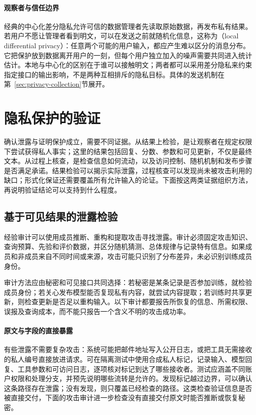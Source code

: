 \paragraph{观察者与信任边界}

经典的中心化差分隐私允许可信的数据管理者先读取原始数据，再发布私有结果。若用户不愿让管理者看到明文，可以在发送之前就随机化信息，这称为（local differential privacy）：任意两个可能的用户输入，都应产生难以区分的消息分布。它把保护放到数据离开用户的一刻，但每个用户独立加入的噪声需要共同进入统计估计。本地与中心化的区别在于谁可以接触明文；两者都可以采用差分隐私来约束指定接口的输出影响，不是两种互相排斥的隐私目标。具体的发送机制在第~\ref{sec:privacy-collection}节展开。

\section{隐私保护的验证}
\label{sec:privacy-verification}

确认泄露与证明保护成立，需要不同证据。从结果上检验，是让观察者在规定权限下尝试获得私人事实；这里的结果包括回复、分数、参数和可见更新，不仅是最终文本。从过程上核查，是检查信息如何流动，以及访问控制、随机机制和发布步骤是否满足承诺。结果检验可以揭示实际泄露，过程核查可以发现尚未被攻击利用的缺口；形式化保证还需要覆盖所有允许输入的论证。下面按这两类证据组织方法，再说明验证结论可以支持到什么程度。

\subsection{基于可见结果的泄露检验}
\label{sec:privacy-leakage-audit}

经验审计可以使用成员推断、重构和提取攻击寻找泄露。审计必须固定攻击知识、查询预算、先验和评价数据，并区分随机猜测、总体规律与记录特有信息。如果成员和非成员来自不同时间或来源，攻击可能只识别了分布差异，未必识别训练成员身份。

审计方法应由秘密和可见接口共同选择：若秘密是某条记录是否参加训练，就检验成员身份；若关心发布模型能否复现私有内容，就尝试内容提取；若训练时共享更新，则检查更新是否足以重构输入。以下审计都要报告所恢复的信息、所需权限、误报及查询成本，而不能只报告一个含义不明的攻击成功率。

\paragraph{原文与字段的直接暴露}

有些泄露不需要复杂攻击：系统可能把邮件地址写入公开日志，或把工具无需接收的私人编号直接放进请求。可在隔离测试中使用合成私人标记，记录输入、模型回复、工具参数和可访问日志，逐项核对标记到达了哪些接收者。测试应涵盖不同账户权限和处理分支，并预先说明哪些流转是允许的。发现标记越过边界，可以确认这条路径存在泄露；没有发现，则只覆盖已经检查的路径。这类检查验证信息是否被直接交付，下面的攻击审计进一步检查没有直接交付原文时能否推断或恢复秘密。

